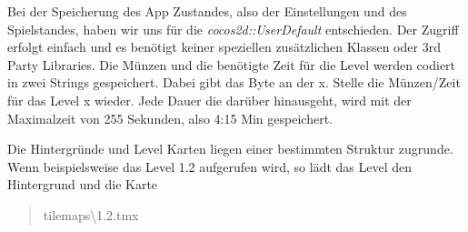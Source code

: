 Bei der Speicherung des App Zustandes, also der Einstellungen und des Spielstandes, haben wir uns für die \textit{cocos2d::UserDefault} entschieden. Der Zugriff erfolgt einfach und es benötigt keiner speziellen zusätzlichen Klassen oder 3rd Party Libraries. Die Münzen und die benötigte Zeit für die Level werden codiert in zwei Strings gespeichert. Dabei gibt das Byte an der x. Stelle die Münzen/Zeit für das Level x wieder. Jede Dauer die darüber hinausgeht, wird mit der Maximalzeit von 255 Sekunden, also 4:15 Min gespeichert.

Die Hintergründe und Level Karten liegen einer bestimmten Struktur zugrunde. Wenn beispielsweise das Level 1.2 aufgerufen wird, so lädt das Level den Hintergrund  und die Karte \blockquote{tilemaps\textbackslash 1.2.tmx}.


